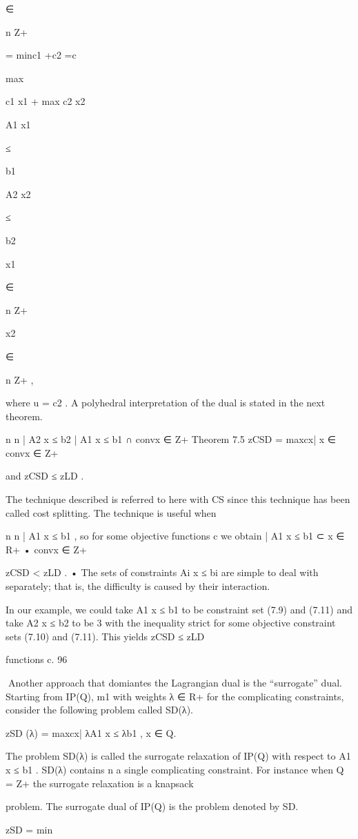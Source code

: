 ∈

n
Z+

= minc1 +c2 =c {

max

c1 x1 + max c2 x2 }

A1 x1

≤

b1

A2 x2

≤

b2

x1

∈

n
Z+

x2

∈

n
Z+
,

where u = c2 .
A polyhedral interpretation of the dual is stated in the next theorem.

n
n
| A2 x ≤ b2 
| A1 x ≤ b1  ∩ convx ∈ Z+
Theorem 7.5 zCSD = maxcx| x ∈ convx ∈ Z+

and zCSD ≤ zLD .

The technique described is referred to here with CS since this technique has been called cost splitting.
The technique is useful when

n
n
| A1 x ≤ b1 , so for some objective functions c we obtain
| A1 x ≤ b1  ⊂ x ∈ R+
• convx ∈ Z+

zCSD < zLD .
• The sets of constraints Ai x ≤ bi are simple to deal with separately; that is, the difficulty is caused
by their interaction.

In our example, we could take A1 x ≤ b1 to be constraint set (7.9) and (7.11) and take A2 x ≤ b2 to be
3
with the inequality strict for some objective
constraint sets (7.10) and (7.11). This yields zCSD ≤ zLD

functions c.
96

Another approach that domiantes the Lagrangian dual is the “surrogate” dual. Starting from IP(Q),
m1
with weights λ ∈ R+
for the complicating constraints, consider the following problem called SD(λ).

zSD (λ) = max{cx| λA1 x ≤ λb1 , x ∈ Q}.

The problem SD(λ) is called the surrogate relaxation of IP(Q) with respect to A1 x ≤ b1 . SD(λ) contains
n
a single complicating constraint. For instance when Q = Z+
the surrogate relaxation is a knapsack

problem. The surrogate dual of IP(Q) is the problem denoted by SD.

zSD = min

